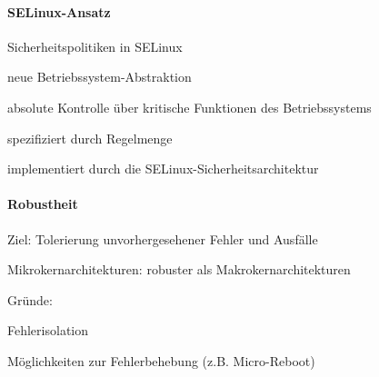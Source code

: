 \documentclass[a4pape]{article}
\begin{document}
\begin{multicols}{3}
  \paragraph{SELinux-Ansatz}
  \begin{itemize*}
    \item\item Sicherheitspolitiken in SELinux
    \item neue Betriebssystem-Abstraktion
    \begin{itemize*}
      \item\item absolute Kontrolle über kritische Funktionen des Betriebssystems
      \item spezifiziert durch Regelmenge
      \item implementiert durch die SELinux-Sicherheitsarchitektur
    \end{itemize*}
  \end{itemize*}

  \paragraph{Robustheit}
  \begin{itemize*}
    \item Ziel: Tolerierung unvorhergesehener Fehler und Ausfälle
    \item Mikrokernarchitekturen: robuster als Makrokernarchitekturen
    \item Gründe:
    \begin{itemize*}
      \item\item Fehlerisolation
      \item Möglichkeiten zur Fehlerbehebung (z.B. Micro-Reboot)
    \end{itemize*}
  \end{itemize*}


\end{multicols}
\newpage
\end{document}
